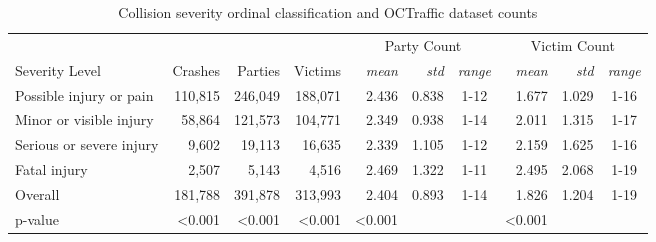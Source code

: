 \begin{table}[h!]
\caption{Collision severity ordinal classification and OCTraffic dataset counts}
\label{tbl1}
\begin{tabular}{lrrrrrcrrc}
\toprule
\multicolumn{4}{c}{} & \multicolumn{3}{c}{Party Count\footnotemark[1]} & \multicolumn{3}{c}{Victim Count\footnotemark[1]} \\
Severity Level & Crashes & Parties & Victims & \textit{mean} & \textit{std} & \textit{range} & \textit{mean} & \textit{std} & \textit{range} \\
\midrule
Possible injury or pain & 110,815 & 246,049 & 188,071 & 2.436 & 0.838 & 1-12 & 1.677 & 1.029 & 1-16 \\
Minor or visible injury & 58,864 & 121,573 & 104,771 & 2.349 & 0.938 & 1-14 & 2.011 & 1.315 & 1-17 \\
Serious or severe injury & 9,602 & 19,113 & 16,635 & 2.339 & 1.105 & 1-12 & 2.159 & 1.625 & 1-16 \\
Fatal injury & 2,507 & 5,143 & 4,516 & 2.469 & 1.322 & 1-11 & 2.495 & 2.068 & 1-19 \\
\midrule
Overall & 181,788 & 391,878 & 313,993 & 2.404 & 0.893 & 1-14 & 1.826 & 1.204 & 1-19 \\
p-value & \textless{}0.001\footnotemark[2] & \textless{}0.001\footnotemark[2] & \textless{}0.001\footnotemark[2] & \textless{}0.001\footnotemark[3] &  &  & \textless{}0.001\footnotemark[3] &  &  \\
\bottomrule
\end{tabular}
\end{table}
